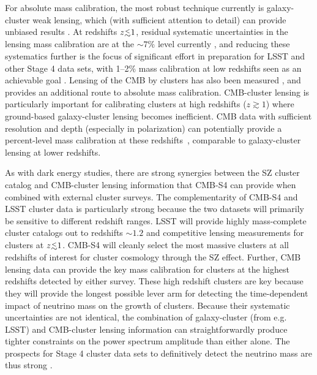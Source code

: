 For absolute mass calibration, the most robust technique currently is galaxy-cluster weak lensing, which (with sufficient attention to detail) can provide unbiased results \cite{Corless:2009hi,Becker:2010xj}. At redshifts $z\lsim1$, residual systematic uncertainties in the lensing mass calibration are at the $\sim7\%$ level currently \cite{Applegate:2012kr}, and reducing these systematics further is the focus of significant effort in preparation for LSST and other Stage 4 data sets, with 1--2\% mass calibration at low redshifts seen as an achievable goal \cite{Abate:2012za}. Lensing of the CMB by clusters has also been measured \cite{Madhavacheril:2014slf,Baxter:2014frs,Melin:2014uaa}, and provides an additional route to absolute mass calibration. CMB-cluster lensing is particularly important for calibrating clusters at high redshifts ($z\gtrsim1$) where ground-based galaxy-cluster lensing becomes inefficient. CMB data with sufficient resolution and depth (especially in polarization) can potentially provide a percent-level mass calibration at these redshifts~\cite{Hu:2007bt}, comparable to galaxy-cluster lensing at lower redshifts.

As with dark energy studies, there are strong synergies between the SZ cluster catalog and CMB-cluster lensing information that CMB-S4 can provide when combined with external cluster surveys. The complementarity of CMB-S4 and LSST cluster data is particularly strong because the two datasets will primarily be sensitive to different redshift ranges. LSST will provide highly mass-complete cluster catalogs out to redshifts $\sim1.2$ and competitive lensing measurements for clusters at $z\lsim 1$. CMB-S4 will cleanly select the most massive clusters at all redshifts of interest for cluster cosmology through the SZ effect. Further, CMB lensing data can provide the key mass calibration for clusters at the highest redshifts detected by either survey. These high redshift clusters are key because they will provide the longest possible lever arm for detecting the time-dependent impact of neutrino mass on the growth of clusters.  Because their systematic uncertainties are not identical, the combination of galaxy-cluster (from e.g. LSST) and CMB-cluster lensing information can straightforwardly produce tighter constraints on the power spectrum amplitude than either alone. The prospects for Stage 4 cluster data sets to definitively detect the neutrino mass are thus strong \cite{Mantz:2014paa,Wang:2005vr}.









